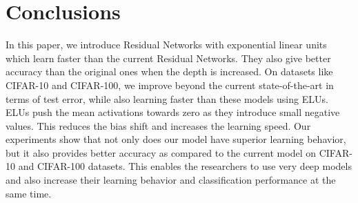 \documentclass[10pt,twocolumn,letterpaper]{article}
\begin{document}
\section{Conclusions}

In this paper, we introduce Residual Networks with exponential linear units which learn faster than the current Residual Networks. They also give better accuracy than the original ones when the depth is increased. On datasets like CIFAR-10 and CIFAR-100, we improve beyond the current state-of-the-art in terms of test error, while also learning faster than these models using ELUs. ELUs push the mean activations towards zero as they introduce small negative values. This reduces the bias shift and increases the learning speed. Our experiments show that not only does our model have superior learning behavior, but it also provides better accuracy as compared to the current model on CIFAR-10 and CIFAR-100 datasets. This enables the researchers to use very deep models and also increase their learning behavior and classification performance at the same time.
\end{document}
